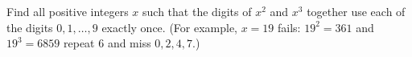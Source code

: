Find all positive integers $x$ such that the digits of $x^2$ and $x^3$ together use each of the digits $0,1,\dots,9$ exactly once. (For example, $x=19$ fails: $19^2=361$ and $19^3=6859$ repeat $6$ and miss $0,2,4,7$.)
